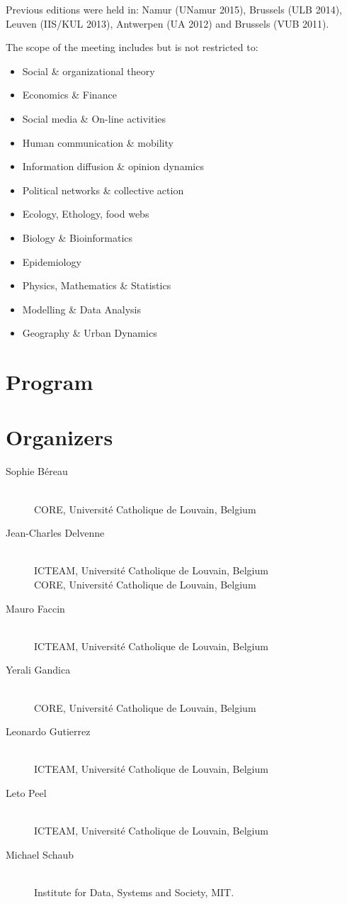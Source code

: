 \documentclass[12pt, a4paper]{scrbook}
\begin{document}
Previous editions were held in:
Namur (UNamur 2015),
Brussels (ULB 2014),
Leuven (IIS/KUL 2013),
Antwerpen (UA 2012) and
Brussels (VUB 2011).

The scope of the meeting includes but is not restricted to:

\begin{itemize}
  \item  Social \& organizational theory
  \item  Economics \& Finance
  \item  Social media \& On-line activities
  \item  Human communication \& mobility
  \item  Information diffusion \& opinion dynamics
  \item  Political networks \& collective action
  \item  Ecology, Ethology, food webs
  \item  Biology \& Bioinformatics
  \item  Epidemiology
  \item  Physics, Mathematics \& Statistics
  \item  Modelling \& Data Analysis
  \item  Geography \& Urban Dynamics
\end{itemize}

\section*{Program}

\begin{center}
  
\end{center}

\section*{Organizers}

\newcommand{\icteam}{ICTEAM, Université Catholique de Louvain, Belgium}
\newcommand{\core}{CORE, Université Catholique de Louvain, Belgium}
\begin{description}
  \item[Sophie Béreau]\ \\
    \core%
  \item[Jean-Charles Delvenne]\ \\
    \icteam\\
    \core%
  \item[Mauro Faccin]\ \\
    \icteam%
  \item[Yerali Gandica]\ \\
    \core%
  \item[Leonardo Gutierrez]\ \\
    \icteam%
  \item[Leto Peel]\ \\
    \icteam%
  \item[Michael Schaub]\ \\
    Institute for Data, Systems and Society, MIT.
\end{description}
\end{document}
